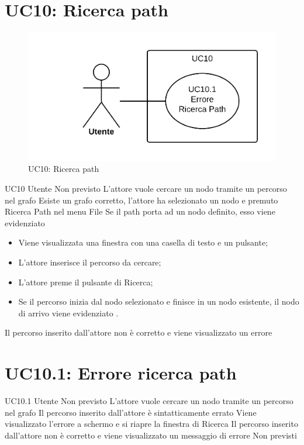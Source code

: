 \documentclass[../AnalisideiRequisiti.tex]{subfiles}
\begin{document}
\section{UC10: Ricerca path}
\begin{figure}[H]
	\centering
	\includegraphics[width=\textwidth]{../img/UC10.png}
	\caption{UC10: Ricerca path}
\end{figure}
\UserCase
{UC10}
{Utente}
{Non previsto}
{L'attore vuole cercare un nodo tramite un percorso nel grafo}
{Esiste un grafo corretto, l'attore ha selezionato un nodo e premuto Ricerca Path nel menu File}
{Se il path porta ad un nodo definito, esso viene evidenziato }
{
	\begin{itemize}
		\item{} Viene visualizzata una finestra con una casella di testo e un pulsante;
		\item{} L'attore inserisce il percorso da cercare;
		\item{} L'attore preme il pulsante di Ricerca;
		\item{} Se il percorso inizia dal nodo selezionato e finisce in un nodo esistente, il nodo di arrivo viene evidenziato .
 	\end{itemize}
}
{Il percorso inserito dall'attore non è corretto e viene visualizzato un errore }

\section{UC10.1: Errore ricerca path}
\UserCase
{UC10.1}
{Utente}
{Non previsto}
{L'attore vuole cercare un nodo tramite un percorso nel grafo}
{Il percorso inserito dall'attore è sintatticamente errato}
{Viene visualizzato l'errore a schermo e si riapre la finestra di Ricerca }
{Il percorso inserito dall'attore non è corretto e viene visualizzato un messaggio di errore}
{Non previsti}
\end{document}
